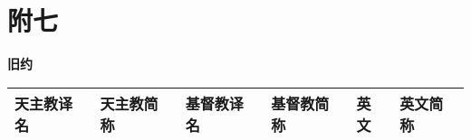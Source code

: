\chapter*{附七}


\begin{center}
	\textbf{旧约}
\end{center}


{
	\scriptsize
	
	\begin{longtable}{|l|l|l|l|l|l|}
		
		\hline 
		\textbf{天主教译名} & \textbf{天主教简称} & \textbf{基督教译名} & \textbf{基督教简称} & \textbf{英文} & \textbf{英文简称} \\ 
		\hline 
		\endhead
		

\end{longtable}}
